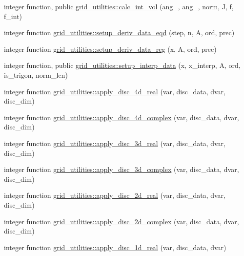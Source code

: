 \begin{DoxyCompactItemize}
\item 
integer function, public \hyperlink{namespacegrid__utilities_a97e3106dbdc10b726af74afa113ba533}{grid\+\_\+utilities\+::calc\+\_\+int\+\_\+vol} (ang\+\_, ang\+\_, norm, J, f, f\+\_\+int)
\item 
integer function \hyperlink{namespacegrid__utilities_a32f5edd35f6976236b9848f56f951c83}{grid\+\_\+utilities\+::setup\+\_\+deriv\+\_\+data\+\_\+eqd} (step, n, A, ord, prec)
\item 
integer function \hyperlink{namespacegrid__utilities_a383fb7484b5a315a3b8019d388f88617}{grid\+\_\+utilities\+::setup\+\_\+deriv\+\_\+data\+\_\+reg} (x, A, ord, prec)
\item 
integer function, public \hyperlink{namespacegrid__utilities_a43206328f85253a6cc821cd46a498bb6}{grid\+\_\+utilities\+::setup\+\_\+interp\+\_\+data} (x, x\+\_\+interp, A, ord, is\+\_\+trigon, norm\+\_\+len)
\item 
integer function \hyperlink{namespacegrid__utilities_a9494e086550e67e6d1319d94d37e15ef}{grid\+\_\+utilities\+::apply\+\_\+disc\+\_\+4d\+\_\+real} (var, disc\+\_\+data, dvar, disc\+\_\+dim)
\item 
integer function \hyperlink{namespacegrid__utilities_a7fcde4b046076294fc8d2ca130f84add}{grid\+\_\+utilities\+::apply\+\_\+disc\+\_\+4d\+\_\+complex} (var, disc\+\_\+data, dvar, disc\+\_\+dim)
\item 
integer function \hyperlink{namespacegrid__utilities_a876f338471e643a680893b9a19715016}{grid\+\_\+utilities\+::apply\+\_\+disc\+\_\+3d\+\_\+real} (var, disc\+\_\+data, dvar, disc\+\_\+dim)
\item 
integer function \hyperlink{namespacegrid__utilities_a2e42ad0b765c9292bc7010069359cc28}{grid\+\_\+utilities\+::apply\+\_\+disc\+\_\+3d\+\_\+complex} (var, disc\+\_\+data, dvar, disc\+\_\+dim)
\item 
integer function \hyperlink{namespacegrid__utilities_a9ffa0404a239305f4c0c577d1e34a791}{grid\+\_\+utilities\+::apply\+\_\+disc\+\_\+2d\+\_\+real} (var, disc\+\_\+data, dvar, disc\+\_\+dim)
\item 
integer function \hyperlink{namespacegrid__utilities_a7cb36e1ff9abd22f7f18d8b65215c67f}{grid\+\_\+utilities\+::apply\+\_\+disc\+\_\+2d\+\_\+complex} (var, disc\+\_\+data, dvar, disc\+\_\+dim)
\item 
integer function \hyperlink{namespacegrid__utilities_ae57cbda514cf4bf01714e0746ff342a2}{grid\+\_\+utilities\+::apply\+\_\+disc\+\_\+1d\+\_\+real} (var, disc\+\_\+data, dvar)
\item 

\end{DoxyCompactItemize}
